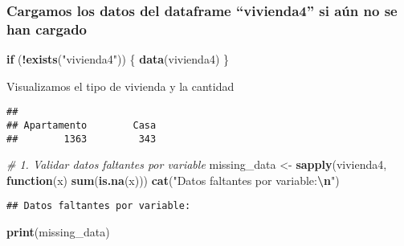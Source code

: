 \documentclass[
]{article}
\newenvironment{Shaded}{\begin{snugshade}}{\end{snugshade}}
\newcommand{\CommentTok}[1]{\textcolor[rgb]{0.56,0.35,0.01}{\textit{#1}}}
\newcommand{\ControlFlowTok}[1]{\textcolor[rgb]{0.13,0.29,0.53}{\textbf{#1}}}
\newcommand{\FunctionTok}[1]{\textcolor[rgb]{0.13,0.29,0.53}{\textbf{#1}}}
\newcommand{\NormalTok}[1]{#1}
\newcommand{\OtherTok}[1]{\textcolor[rgb]{0.56,0.35,0.01}{#1}}
\newcommand{\SpecialCharTok}[1]{\textcolor[rgb]{0.81,0.36,0.00}{\textbf{#1}}}
\newcommand{\StringTok}[1]{\textcolor[rgb]{0.31,0.60,0.02}{#1}}
\begin{document}
\subsubsection{Cargamos los datos del dataframe ``vivienda4'' si aún no
se han
cargado}\label{cargamos-los-datos-del-dataframe-vivienda4-si-auxfan-no-se-han-cargado}

\begin{Shaded}
\begin{Highlighting}[]
\ControlFlowTok{if}\NormalTok{ (}\SpecialCharTok{!}\FunctionTok{exists}\NormalTok{(}\StringTok{"vivienda4"}\NormalTok{)) \{}
  \FunctionTok{data}\NormalTok{(vivienda4)}
\NormalTok{\}}
\end{Highlighting}
\end{Shaded}

Visualizamos el tipo de vivienda y la cantidad

\begin{Shaded}
\end{Shaded}

\begin{verbatim}
## 
## Apartamento        Casa 
##        1363         343
\end{verbatim}

\begin{Shaded}
\begin{Highlighting}[]
\CommentTok{\# 1. Validar datos faltantes por variable}
\NormalTok{missing\_data }\OtherTok{\textless{}{-}} \FunctionTok{sapply}\NormalTok{(vivienda4, }\ControlFlowTok{function}\NormalTok{(x) }\FunctionTok{sum}\NormalTok{(}\FunctionTok{is.na}\NormalTok{(x)))}
\FunctionTok{cat}\NormalTok{(}\StringTok{"Datos faltantes por variable:}\SpecialCharTok{\textbackslash{}n}\StringTok{"}\NormalTok{)}
\end{Highlighting}
\end{Shaded}

\begin{verbatim}
## Datos faltantes por variable:
\end{verbatim}

\begin{Shaded}
\begin{Highlighting}[]
\FunctionTok{print}\NormalTok{(missing\_data)}
\end{Highlighting}
\end{Shaded}
\end{document}
